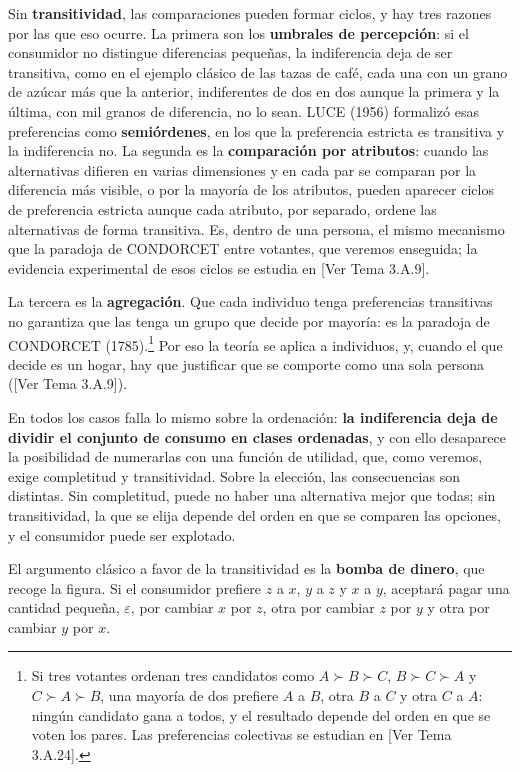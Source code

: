 \documentclass[10pt,a4paper]{article}
\newcommand{\authorfont}[1]{{\fontfamily{EBGaramond-TLF}\selectfont #1}}
\begin{document}
Sin \textbf{transitividad}, las comparaciones pueden formar ciclos, y hay tres razones por las que eso ocurre. La primera son los \textbf{umbrales de percepción}: si el consumidor no distingue diferencias pequeñas, la indiferencia deja de ser transitiva, como en el ejemplo clásico de las tazas de café, cada una con un grano de azúcar más que la anterior, indiferentes de dos en dos aunque la primera y la última, con mil granos de diferencia, no lo sean. LUCE (1956) formalizó esas preferencias como \textbf{semiórdenes}, en los que la preferencia estricta es transitiva y la indiferencia no. La segunda es la \textbf{comparación por atributos}: cuando las alternativas difieren en varias dimensiones y en cada par se comparan por la diferencia más visible, o por la mayoría de los atributos, pueden aparecer ciclos de preferencia estricta aunque cada atributo, por separado, ordene las alternativas de forma transitiva. Es, dentro de una persona, el mismo mecanismo que la paradoja de CONDORCET entre votantes, que veremos enseguida; la evidencia experimental de esos ciclos se estudia en [\authorfont{Ver Tema 3.A.9}].

La tercera es la \textbf{agregación}. Que cada individuo tenga preferencias transitivas no garantiza que las tenga un grupo que decide por mayoría: es la paradoja de CONDORCET (1785).\footnote{%
    Si tres votantes ordenan tres candidatos como $A\succ B\succ C$, $B\succ C\succ A$ y $C\succ A\succ B$, una mayoría de dos prefiere $A$ a $B$, otra $B$ a $C$ y otra $C$ a $A$: ningún candidato gana a todos, y el resultado depende del orden en que se voten los pares. Las preferencias colectivas se estudian en [\authorfont{Ver Tema 3.A.24}].
} Por eso la teoría se aplica a individuos, y, cuando el que decide es un hogar, hay que justificar que se comporte como una sola persona ([\authorfont{Ver Tema 3.A.9}]).

En todos los casos falla lo mismo sobre la ordenación: \textbf{la indiferencia deja de dividir el conjunto de consumo en clases ordenadas}, y con ello desaparece la posibilidad de numerarlas con una función de utilidad, que, como veremos, exige completitud y transitividad. Sobre la elección, las consecuencias son distintas. Sin completitud, puede no haber una alternativa mejor que todas; sin transitividad, la que se elija depende del orden en que se comparen las opciones, y el consumidor puede ser explotado.

El argumento clásico a favor de la transitividad es la \textbf{bomba de dinero}, que recoge la figura. Si el consumidor prefiere $z$ a $x$, $y$ a $z$ y $x$ a $y$, aceptará pagar una cantidad pequeña, $\varepsilon$, por cambiar $x$ por $z$, otra por cambiar $z$ por $y$ y otra por cambiar $y$ por $x$. 
\end{document}
